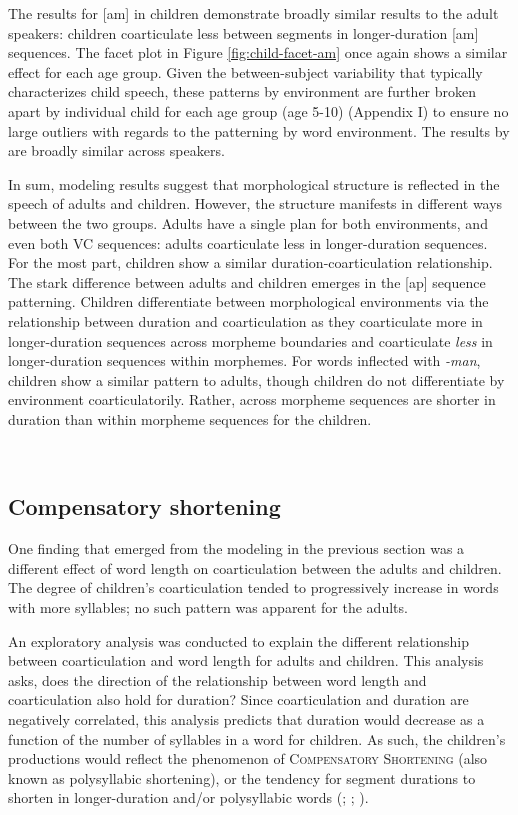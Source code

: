 \documentclass[a4paper,man,floatsintext,natbib,donotrepeattitle, apacite]{apa6}
\begin{document}
The results for {[}am{]} in children demonstrate broadly similar results to the adult speakers: children coarticulate less between segments in longer-duration {[}am{]} sequences. The facet plot in Figure \ref{fig:child-facet-am} once again shows a similar effect for each age group. Given the between-subject variability that typically characterizes child speech, these patterns by environment are further broken apart by individual child for each age group (age 5-10) (Appendix I) to ensure no large outliers with regards to the patterning by word environment. The results by are broadly similar across speakers.

In sum, modeling results suggest that morphological structure is reflected in the speech of adults and children. However, the structure manifests in different ways between the two groups. Adults have a single plan for both environments, and even both VC sequences: adults coarticulate less in longer-duration sequences. For the most part, children show a similar duration-coarticulation relationship. The stark difference between adults and children emerges in the {[}ap{]} sequence patterning. Children differentiate between morphological environments via the relationship between duration and coarticulation as they coarticulate more in longer-duration sequences across morpheme boundaries and coarticulate \emph{less} in longer-duration sequences within morphemes. For words inflected with \emph{-man}, children show a similar pattern to adults, though children do not differentiate by environment coarticulatorily. Rather, across morpheme sequences are shorter in duration than within morpheme sequences for the children.


~
~

\subsection{Compensatory shortening}\label{compensatory-shortening}

One finding that emerged from the modeling in the previous section was a different effect of word length on coarticulation between the adults and children. The degree of children's coarticulation tended to progressively increase in words with more syllables; no such pattern was apparent for the adults.

An exploratory analysis was conducted to explain the different relationship between coarticulation and word length for adults and children. This analysis asks, does the direction of the relationship between word length and coarticulation also hold for duration? Since coarticulation and duration are negatively correlated, this analysis predicts that duration would decrease as a function of the number of syllables in a word for children. As such, the children's productions would reflect the phenomenon of \textsc{Compensatory Shortening} (also known as polysyllabic shortening), or the tendency for segment durations to shorten in longer-duration and/or polysyllabic words (\citealt{harringtonRelationshipProsodicWeakening2015}; \citealt{lehistePerceptionCoarticulationEffects1972}; \citealt{munhallCompensatoryShorteningMonosyllables1992}).
\end{document}
